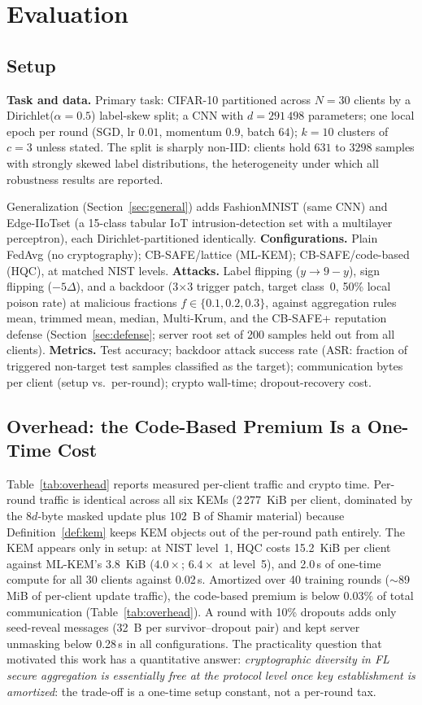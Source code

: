 \documentclass[lettersize,journal]{IEEEtran}
\begin{document}
\section{Evaluation}\label{sec:eval}
\subsection{Setup}
\textbf{Task and data.} Primary task: CIFAR-10 partitioned across $N{=}30$ clients
by a Dirichlet($\alpha{=}0.5$) label-skew split; a CNN with $d{=}291\,498$
parameters; one local epoch per round (SGD, lr $0.01$, momentum $0.9$, batch $64$);
$k{=}10$ clusters of $c{=}3$ unless stated. The split is sharply non-IID: clients
hold $631$ to $3298$ samples with strongly skewed label distributions, the
heterogeneity under which all robustness results are reported.

Generalization (Section~\ref{sec:general})
adds FashionMNIST (same CNN) and Edge-IIoTset (a 15-class tabular IoT
intrusion-detection set with a multilayer perceptron), each Dirichlet-partitioned
identically. \textbf{Configurations.} Plain FedAvg (no
cryptography); CB-SAFE/lattice (ML-KEM); CB-SAFE/code-based (HQC), at matched NIST
levels. \textbf{Attacks.} Label flipping ($y \to 9-y$), sign flipping
($-5\Delta$), and a backdoor \cite{bagdasaryan2020} (3$\times$3 trigger patch,
target class~0, 50\% local poison rate) at malicious fractions $f \in \{0.1, 0.2, 0.3\}$, against aggregation
rules mean, trimmed mean, median, Multi-Krum, and the CB-SAFE+ reputation defense
(Section~\ref{sec:defense}; server root set of 200 samples held out from all
clients). \textbf{Metrics.} Test accuracy;
backdoor attack success rate (ASR: fraction of triggered non-target test samples
classified as the target); communication bytes per client (setup vs.\ per-round);
crypto wall-time; dropout-recovery cost.

\subsection{Overhead: the Code-Based Premium Is a One-Time Cost}
Table~\ref{tab:overhead} reports measured per-client traffic and crypto time.
Per-round traffic is identical across all six KEMs (2\,277~KiB per client,
dominated by the $8d$-byte masked update plus 102~B of Shamir material) because
Definition~\ref{def:kem} keeps KEM objects out of the per-round path entirely. The
KEM appears only in setup: at NIST level~1, HQC costs 15.2~KiB per client against
ML-KEM's 3.8~KiB ($4.0\times$; $6.4\times$ at level~5), and 2.0\,s of one-time
compute for all 30 clients against 0.02\,s. Amortized over 40 training rounds
($\sim$89\,MiB of per-client update traffic), the code-based premium is below
$0.03\%$ of total communication (Table~\ref{tab:overhead}). A round with 10\% dropouts
adds only seed-reveal messages (32~B per survivor--dropout pair) and kept server
unmasking below 0.28\,s in all configurations. The practicality question that
motivated this work has a quantitative answer: \emph{cryptographic diversity in FL
secure aggregation is essentially free at the protocol level once key establishment
is amortized}: the trade-off is a one-time setup constant, not a per-round tax.
\end{document}
